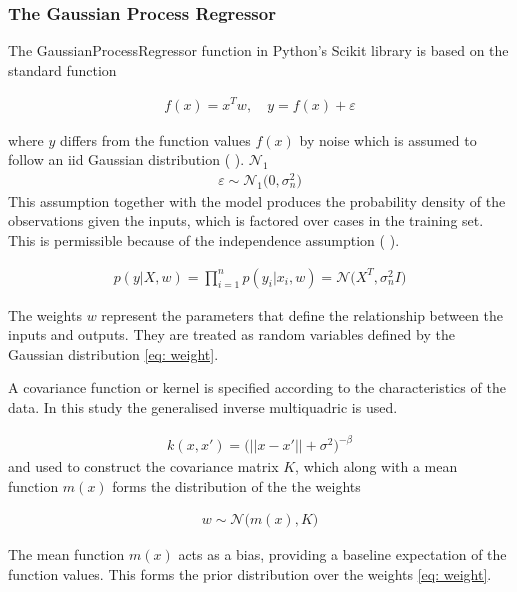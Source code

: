 \documentclass[11pt,a4paper]{article}
\newcommand{\citeboth}[1]{\citeauthor{#1} \citep{#1}}
\begin{document}
\subsubsection{The Gaussian Process Regressor}

The GaussianProcessRegressor function in Python's Scikit library is based on the 
standard function

\begin{align} 
    f(x) = x^{T}w, \quad{y = f(x) + \varepsilon}
\end{align}

where $y$ differs from the function values $f(x)$ by noise which is assumed
to follow an iid Gaussian distribution (\citeboth{rasmussen2006}). 
$\mathcal{N}_1$
\begin{align*}
    \varepsilon \sim \mathcal{N}_1 \bigl(0, \sigma_{n}^2\bigr)
\end{align*}
This assumption together with the model produces the 
probability density of the observations given the inputs, 
which is factored over cases in the training set. This is
permissible because of the independence assumption (\citeboth{rasmussen2006}).

\begin{align}
    p(y|X,w) = \prod_{i=1}^{n} p(y_i|x_i ,w) = \mathcal{N}\bigl(X^T, \sigma_{n}^2 I\bigr)
\end{align}

The weights \( w \) represent the parameters that define the relationship between the inputs and outputs. 
They are treated as random variables defined by the Gaussian distribution \eqref{eq: weight}.


A covariance function or kernel
is specified according to the characteristics of the data. In this study the
generalised inverse multiquadric is used.

\begin{align}
    k(x,x') = \biggl( ||x-x'|| + \sigma^2\biggr)^{-\beta} \label{eq: gimq}
\end{align}
and used to construct the covariance matrix $K$, which along with 
a mean function $m(x)$ forms the distribution of the the weights 

\begin{align}
    w \sim \mathcal{N}\bigl(m(x), K\bigr) \label{eq: weight}
\end{align}


The mean function $m(x)$ acts as a bias, 
providing a baseline expectation of the function values. 
This forms the prior distribution over the weights \eqref{eq: weight}.
\end{document}
